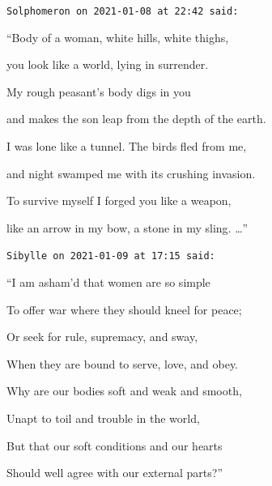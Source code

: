 \begin{footnotesize}\begin{sffamily}



\texttt{Solphomeron on 2021-01-08 at 22:42 said: }

“Body of a woman, white hills, white thighs,

you look like a world, lying in surrender.

My rough peasant's body digs in you

and makes the son leap from the depth of the earth.

I was lone like a tunnel. The birds fled from me,

and night swamped me with its crushing invasion.

To survive myself I forged you like a weapon,

like an arrow in my bow, a stone in my sling. …”


\hfill

\texttt{Sibylle on 2021-01-09 at 17:15 said: }

“I am asham'd that women are so simple

To offer war where they should kneel for peace;

Or seek for rule, supremacy, and sway,

When they are bound to serve, love, and obey.

Why are our bodies soft and weak and smooth,

Unapt to toil and trouble in the world,

But that our soft conditions and our hearts

Should well agree with our external parts?”


\end{sffamily}\end{footnotesize}

